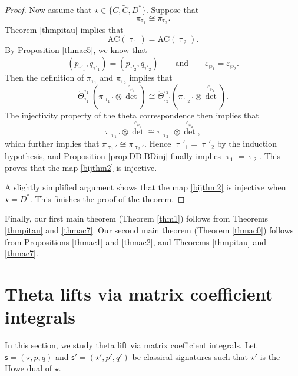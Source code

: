 \documentclass[12pt,a4paper]{amsart}
\numberwithin{equation}{section}
\theoremstyle{remark}
\begin{document}
\begin{proof}
Now assume that $\star\in \{C,\widetilde C, D^*\}$. Suppose that
\[
  \pi_{\uptau_1}\cong \pi_{\uptau_2}.
\]
Theorem \ref{thmpitau} implies that
\[
\mathrm{AC}(\uptau_1)=\mathrm{AC}(\uptau_2).
\]
By Proposition \ref{thmac5}, we know that
\[
 ( p_{\tau'_1}, q_{\tau'_1})=( p_{\tau'_2}, q_{\tau'_2})\qquad\textrm{and}\qquad \varepsilon_{\wp_1}=\varepsilon_{\wp_2}.
\]
Then the definition of $ \pi_{\uptau_1}$ and $ \pi_{\uptau_2}$ implies that
\[
  \check \Theta_{\tau_1'}^{\tau_1}(\pi_{\uptau_1'}\otimes {\det}^{\varepsilon_{\wp_1}})\cong \check \Theta_{\tau_2'}^{\tau_2}(\pi_{\uptau_2'}\otimes {\det}^{\varepsilon_{\wp_1}}).
\]
The injectivity property of the theta correspondence then implies that
\[
\pi_{\uptau_1'}\otimes {\det}^{\varepsilon_{\wp_1}}\cong \pi_{\uptau_2'}\otimes {\det}^{\varepsilon_{\wp_2}},
\]
which further implies that $\pi_{\uptau_1'}\cong \pi_{\uptau_2'}$.
Hence $\uptau'_1=\uptau'_2$ by the induction hypothesis, and Proposition \ref{prop:DD.BDinj} finally implies $\uptau_1=\uptau_2$. This proves that the map \eqref{bijthm2} is injective.

A slightly simplified argument shows that the map \eqref{bijthm2} is injective when $\star=D^*$. This finishes the proof of the theorem.



\end{proof}

Finally, our first main theorem (Theorem \ref{thm1}) follows from Theorems \ref{thmpitau} and \ref{thmac7}. Our second main theorem (Theorem \ref{thmac0}) follows from Propositions \ref{thmac1} and \ref{thmac2}, and Theorems \ref{thmpitau} and \ref{thmac7}.



\section{Theta lifts via matrix coefficient integrals}\label{sec:Integrals}%

In this section,
we study theta lift via
matrix coefficient integrals. Let $\mathsf s=(\star, p,q)$ and $ \mathsf s'=(\star', p',q')$ be classical signatures such that $\star'$ is the Howe dual of $\star$.
\end{document}
